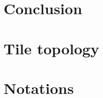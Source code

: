 \documentclass[a4paper,11pt]{report}
\begin{document}
	\chapter{Conclusion}
	
	
	\appendix
	
	\chapter{Tile topology}
	
	
	\chapter*{Notations}
	
	\newpage

	
	\listoftables
	
	\listoffigures
	
	\printbibliography[heading=bibintoc]
\end{document}
